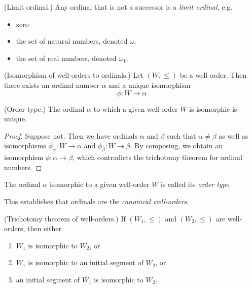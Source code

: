 \documentclass[11pt]{article}
\begin{document}
\begin{defn}{(Limit ordinal.)}
    Any ordinal that is not a successor is a \emph{limit ordinal}, e.g.
    \begin{itemize}
        \item zero
        \item the set of natural numbers, denoted $\omega$.
        \item the set of real numbers, denoted $\omega_1$.
    \end{itemize}
\end{defn}

\begin{thm}{(Isomorphism of well-orders to ordinals.)}
    Let $(W, \leq)$ be a well-order.
    Then there exists an ordinal number $\alpha$ and a unique isomorphism
    \begin{equation*}
        \phi : W \to \alpha
    \end{equation*}
\end{thm}

\begin{cor}{(Order type.)}
    The ordinal $\alpha$ to which a given well-order $W$ is isomorphic is
    unique.
\end{cor}

\begin{proof}
    Suppose not.
    Then we have ordinals $\alpha$ and $\beta$ such that $\alpha \neq \beta$ as
    well as isomorphisms $\phi_\alpha : W \to \alpha$
    and $\phi_\beta : W \to \beta$.
    By composing, we obtain an isomorphism $\phi : \alpha \to \beta$, which
    contradicts the trichotomy theorem for ordinal numbers.
\end{proof}

\begin{defn}
    The ordinal $\alpha$ isomorphic to a given well-order $W$ is called its
    \emph{order type}.
\end{defn}

This establishes that ordinals are the \emph{canonical well-orders}.

\begin{cor}{(Trichotomy theorem of well-orders.)}
    If $(W_1, \leq)$ and $(W_2, \leq)$ are well-orders, then either
    \begin{enumerate}
        \item $W_1$ is isomorphic to $W_2$, or
        \item $W_1$ is isomorphic to an initial segment of $W_2$, or
        \item an initial segment of $W_1$ is isomorphic to $W_2$.
    \end{enumerate}
\end{cor}
\end{document}

